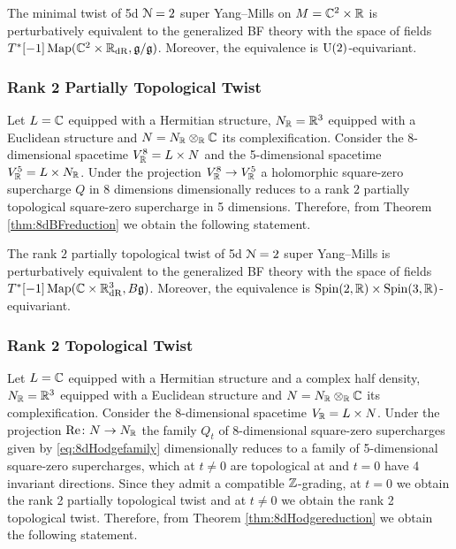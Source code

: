 \documentclass[10pt, oneside]{article}
\begin{document}
\begin{theorem}
The minimal twist of 5d $\mathcal N=2$ super Yang--Mills on $M=\mathbb C^2\times \mathbb R$ is perturbatively equivalent to the generalized BF theory with the space of fields $T^*[-1]\operatorname{Map}(\mathbb C^2\times \mathbb R_{\mathrm{dR}}, \mathfrak g/\mathfrak g)$. Moreover, the equivalence is $\mathrm{U}(2)$-equivariant.
\end{theorem}

\subsubsection{Rank 2 Partially Topological Twist}
\label{sect:5dpartialtwist}

Let $L = \mathbb C$ equipped with a Hermitian structure, $N_\mathbb R=\mathbb R^3$ equipped with a Euclidean structure and $N=N_\mathbb R\otimes_\mathbb R\mathbb C$ its complexification. Consider the 8-dimensional spacetime $V^8_\mathbb R=L\times N$ and the 5-dimensional spacetime $V^5_\mathbb R=L\times N_\mathbb R$. Under the projection $V^8_\mathbb R\rightarrow V^5_\mathbb R$ a holomorphic square-zero supercharge $Q$ in 8 dimensions dimensionally reduces to a rank $2$ partially topological square-zero supercharge in 5 dimensions. Therefore, from Theorem \ref{thm:8dBFreduction} we obtain the following statement.

\begin{theorem}
The rank $2$ partially topological twist of 5d $\mathcal N=2$ super Yang--Mills is perturbatively equivalent to the generalized BF theory with the space of fields $T^*[-1]\operatorname{Map}(\mathbb C\times \mathbb R^3_{\mathrm{dR}}, B\mathfrak g)$. Moreover, the equivalence is $\mathrm{Spin}(2, \mathbb R)\times\mathrm{Spin}(3, \mathbb R)$-equivariant.
\end{theorem}

\subsubsection{Rank 2 Topological Twist}
\label{sect:5drank2topologicaltwist}

Let $L=\mathbb C$ equipped with a Hermitian structure and a complex half density, $N_\mathbb R=\mathbb R^3$ equipped with a Euclidean structure and $N=N_\mathbb R\otimes_\mathbb R\mathbb C$ its complexification. Consider the 8-dimensional spacetime $V_\mathbb R=L\times N$. Under the projection $\mathrm{Re}\colon N\rightarrow N_\mathbb R$ the family $Q_t$ of 8-dimensional square-zero supercharges given by \eqref{eq:8dHodgefamily} dimensionally reduces to a family of 5-dimensional square-zero supercharges, which at $t\neq 0$ are topological at and $t=0$ have 4 invariant directions. Since they admit a compatible $\mathbb Z$-grading, at $t=0$ we obtain the rank 2 partially topological twist and at $t\neq 0$ we obtain the rank 2 topological twist. Therefore, from Theorem \ref{thm:8dHodgereduction} we obtain the following statement.
\end{document}
